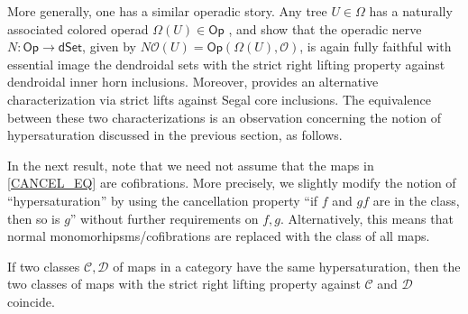 \documentclass[a4paper,10pt
,draft
]{article}%
\begin{document}
More generally, 
one has a similar operadic story. Any tree $U \in \Omega$ has a naturally associated colored operad 
$\Omega(U) \in \mathsf{Op}$ \cite[\S 3]{MW07}, and
\cite[Prop. 5.3 and Thm. 6.1]{MW09} show that the operadic nerve
$N \colon \mathsf{Op} \to \mathsf{dSet}$, 
given by $N\mathcal{O} (U) = \mathsf{Op}(\Omega(U), \mathcal {O})$,
is again fully faithful
with essential image the dendroidal sets with the strict right lifting property against dendroidal inner horn inclusions.
Moreover, \cite[Cor. 2.6]{CM13a} provides an alternative characterization via strict lifts against Segal core inclusions. The equivalence between these two characterizations is an observation concerning the notion of hypersaturation discussed in the previous section, as follows.


In the next result, note that we need not assume that the maps in
\eqref{CANCEL_EQ} are cofibrations. More precisely,
we slightly modify the notion of ``hypersaturation'' by using the cancellation property 
``if $f$ and $gf$ are in the class, then so is $g$'' without further  requirements on $f,g$. Alternatively, this means that normal monomorhipsms/cofibrations are replaced with the class of all maps.

\begin{proposition}\label{HYPERLP PROP}
      If two classes $\mathcal{C},\mathcal{D}$
      of maps in a category
      have the same hypersaturation, then
      the two classes of maps with the strict right lifting property against $\mathcal C$ and $\mathcal D$ coincide.
\end{proposition}
\end{document}
